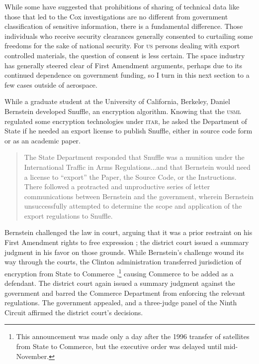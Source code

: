 \documentclass[12pt]{olfmemo}
\begin{document}
While some have suggested that prohibitions of sharing of technical data like those that led to the Cox investigations are no different from government classification of sensitive information, there is a fundamental difference. Those individuals who receive security clearances generally consented to curtailing some freedoms for the sake of national security. For \textsc{us} persons dealing with export controlled materials, the question of consent is less certain. The space industry has generally steered clear of First Amendment arguments, perhaps due to its continued dependence on government funding, so I turn in this next section to a few cases outside of aerospace.

While a graduate student at the University of California, Berkeley, Daniel Bernstein developed Snuffle, an encryption algorithm. Knowing that the \textsc{usml} regulated some encryption technologies under \textsc{itar}, he asked the Department of State if he needed an export license to publish Snuffle, either in source code form or as an academic paper.
\begin{quote}
The State Department responded that Snuffle was a munition under the International Traffic in Arms Regulations...and that Bernstein would need a license to ``export'' the Paper, the Source Code, or the Instructions. There followed a protracted and unproductive series of letter communications between Bernstein and the government, wherein Bernstein unsuccessfully attempted to determine the scope and application of the export regulations to Snuffle. \citep{Bernstein1997}
\end{quote}
%
Bernstein challenged the law in court, arguing that it was a prior restraint on his First Amendment rights to free expression \citep{Bernstein1997}; the district court issued a summary judgment in his favor on those grounds. While Bernstein's challenge wound its way through the courts, the Clinton administration transferred jurisdiction of encryption from State to Commerce \citep{ExecOrder13026_1996},\footnote{This announcement was made only a day after the 1996 transfer of satellites from State to Commerce, but the executive order was delayed until mid-November.} causing Commerce to be added as a defendant. The district court again issued a summary judgment against the government and barred the Commerce Department from enforcing the relevant regulations. The government appealed, and a three-judge panel of the Ninth Circuit affirmed the district court's decisions.
\end{document}
